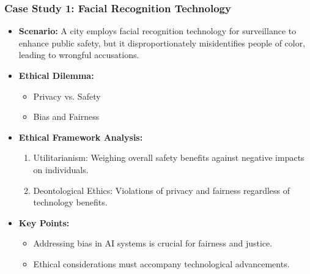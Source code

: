 \documentclass[aspectratio=169]{beamer}
\begin{document}
\begin{frame}[fragile]
    \frametitle{Case Study 1: Facial Recognition Technology}
    
    \begin{itemize}
        \item \textbf{Scenario:} A city employs facial recognition technology for surveillance to enhance public safety, but it disproportionately misidentifies people of color, leading to wrongful accusations.
        
        \item \textbf{Ethical Dilemma:}
        \begin{itemize}
            \item Privacy vs. Safety
            \item Bias and Fairness
        \end{itemize}
        
        \item \textbf{Ethical Framework Analysis:}
        \begin{enumerate}
            \item Utilitarianism: Weighing overall safety benefits against negative impacts on individuals.
            \item Deontological Ethics: Violations of privacy and fairness regardless of technology benefits.
        \end{enumerate}
        
        \item \textbf{Key Points:}
        \begin{itemize}
            \item Addressing bias in AI systems is crucial for fairness and justice.
            \item Ethical considerations must accompany technological advancements.
        \end{itemize}
    \end{itemize}
\end{frame}
\end{document}
